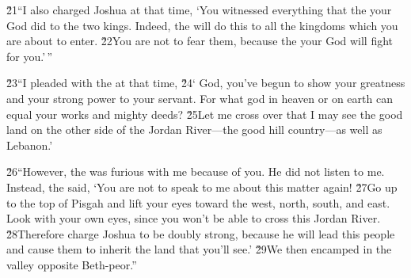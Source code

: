 \v{21}``I also charged Joshua at that time, `You witnessed everything that the  your God did to the two kings. Indeed, the  will do this to all the kingdoms which you are about to enter. \v{22}You are not to fear them, because the  your God will fight for you.'\,''

\v{23}``I pleaded with the  at that time, \v{24}` God, you've begun to show your greatness and your strong power to your servant. For what god in heaven or on earth can equal your works and mighty deeds? \v{25}Let me cross over that I may see the good land on the other side of the Jordan River---the good hill country---as well as Lebanon.'

\v{26}``However, the  was furious with me because of you. He did not listen to me. Instead, the  said, `You are not to speak to me about this matter again! \v{27}Go up to the top of Pisgah and lift your eyes toward the west, north, south, and east. Look with your own eyes, since you won't be able to cross this Jordan River. \v{28}Therefore charge Joshua to be doubly strong, because he will lead this people and cause them to inherit the land that you'll see.' \v{29}We then encamped in the valley opposite Beth-peor.''

